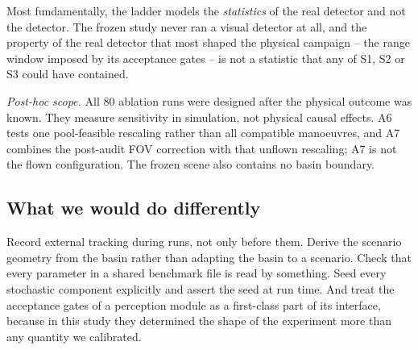Most fundamentally, the ladder models the \emph{statistics} of the real
detector and not the detector. The frozen study never ran a visual
detector at all, and the property of the real detector that most shaped
the physical campaign -- the range window imposed by its acceptance
gates -- is not a statistic that any of S1, S2 or S3 could have
contained.

\emph{Post-hoc scope.} All 80 ablation runs were designed after the
physical outcome was known. They measure sensitivity in simulation, not
physical causal effects. A6 tests one pool-feasible rescaling rather than
all compatible manoeuvres, and A7 combines the post-audit FOV correction
with that unflown rescaling; A7 is not the flown configuration. The
frozen scene also contains no basin boundary.

\subsection{What we would do differently}

Record external tracking during runs, not only before them. Derive the
scenario geometry from the basin rather than adapting the basin to a
scenario. Check that every parameter in a shared benchmark file is read
by something. Seed every stochastic component explicitly and assert the
seed at run time. And treat the acceptance gates of a perception module
as a first-class part of its interface, because in this study they
determined the shape of the experiment more than any quantity we
calibrated.
